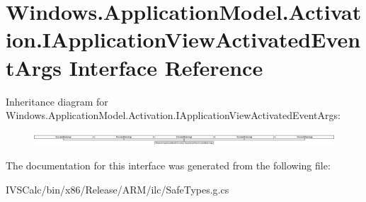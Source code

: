 \hypertarget{interface_windows_1_1_application_model_1_1_activation_1_1_i_application_view_activated_event_args}{}\section{Windows.\+Application\+Model.\+Activation.\+I\+Application\+View\+Activated\+Event\+Args Interface Reference}
\label{interface_windows_1_1_application_model_1_1_activation_1_1_i_application_view_activated_event_args}
Inheritance diagram for Windows.\+Application\+Model.\+Activation.\+I\+Application\+View\+Activated\+Event\+Args\+:\begin{figure}[H]
\begin{center}
\leavevmode
\includegraphics[height=0.506787cm]{interface_windows_1_1_application_model_1_1_activation_1_1_i_application_view_activated_event_args}
\end{center}
\end{figure}


The documentation for this interface was generated from the following file\+:\begin{DoxyCompactItemize}
\item 
I\+V\+S\+Calc/bin/x86/\+Release/\+A\+R\+M/ilc/Safe\+Types.\+g.\+cs\end{DoxyCompactItemize}

